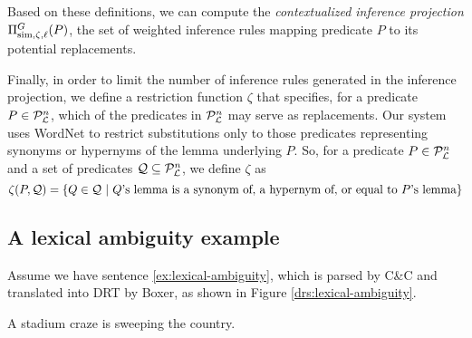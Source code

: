 Based on these definitions, we can compute the \textit{contextualized
inference projection} $\Pi^G_{\mathrm{sim},\zeta,\ell}(P)$, the set of weighted
inference rules mapping predicate $P$ to its potential replacements.

Finally, in order to limit the number of inference rules generated in the
inference projection, we define a restriction function $\zeta$ that specifies,
for a predicate $P \in {\cal{P}}_{{\cal{L}}}^n$, which of the predicates in
${\cal{P}}_{{\cal{L}}}^n$ may serve as replacements.  Our system uses WordNet
\citep{miller:wordnet2009} to restrict substitutions only to those predicates
representing synonyms or hypernyms of the lemma underlying $P$.  So, for a
predicate $P \in {\cal{P}}_{{\cal{L}}}^n$ and a set of predicates ${\cal Q}
\subseteq {\cal{P}}_{{\cal{L}}}^n$, we define $\zeta$ as \[ \zeta(P,{\cal Q}) = \{
Q \in {\cal Q} ~|~ Q\text{'s lemma is a synonym of, a hypernym of, or equal to
}P\text{'s lemma} \} \]


\subsection*{A lexical ambiguity example}

Assume we have sentence \eqref{ex:lexical-ambiguity}, which is parsed by C\&C
and translated into DRT by Boxer, as shown in Figure
\ref{drs:lexical-ambiguity}.

\begin{covex}\label{ex:lexical-ambiguity}
  A stadium craze is sweeping the country.
\end{covex}

